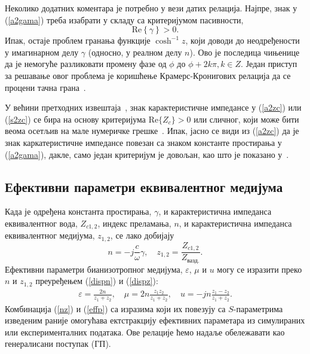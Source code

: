 \documentclass[main.tex]{subfiles}
\begin{document}
Неколико додатних коментара је потребно у вези датих релација. Најпре, знак у (\ref{a2gama}) треба изабрати у складу са критеријумом пасивности, 
\begin{equation}\label{pasivnost}
\mathrm{Re}\left\lbrace\gamma\right\rbrace > 0.
\end{equation}
Ипак, остаје проблем гранања функције $\cosh^{-1}{z}$, који доводи до неодређености у имагинарном делу $\gamma$ (односно, у реалном делу $n$). Ово је последица чињенице да је немогуће разликовати промену фазе од $\phi$ до $\phi + 2k\pi, k\in Z$. Један приступ за решавање овог проблема је коришћење Крамерс-Кронигових релација да се процени тачна грана~\cite{Szabo:10}.

У већини претходних извештаја~\cite{Nicol:70, Weir:74, Smith:02, Markos:03, Mao:05}, знак карактеристичне импедансе у (\ref{a2zc}) или (\ref{s2zc}) се бира на основу критеријума $\mathrm{Re}\{Z_c\}>0$ или сличног, који може бити веома осетљив на мале нумеричке грешке~\cite{Chen:04}. Ипак, јасно се види из (\ref{a2zc}) да је знак каркатеристичне импедансе повезан са знаком константе простирања у (\ref{a2gama}), дакле, само један критеријум је довољан, као што је показано у~\cite{Chen:04}.

\subsection{Ефективни параметри еквивалентног медијума}
Када је одређена константа простирања, $\gamma$, и карактеристична импеданса еквивалентног вода, $Z_{c1,2}$, индекс преламања, $n$, и карактеристична импеданса еквивалентног медијума, $z_{1,2}$, се лако добијају
\begin{equation}\label{nz}
n = -j\frac{c}{\omega}\gamma,\quad z_{1,2}=\frac{Z_{c1,2}}{Z_{вазд.}}.
\end{equation}
Ефективни параметри бианизотропног медијума, $\varepsilon$, $\mu$ и $u$ могу се изразити преко $n$ и $z_{1,2}$ преуређењем (\ref{dispn}) и (\ref{dispz}):
\begin{equation}\label{effp}
\begin{split}
	\varepsilon = \frac{2n}{z_1+z_2},\quad
	\mu = 2n\frac{z_1z_2}{z_1+z_2},\quad
	u = -jn\frac{z_1-z_2}{z_1+z_2}.
\end{split}
\end{equation}
Комбинација (\ref{nz}) и (\ref{effp}) са изразима који их повезују са $S$-параметрима изведеним раније омогућава ектстракцију ефективних параметара из симулираних или експерименталних података. Ове релације ћемо надаље обележавати као генералисани поступак ($ГП$).
\end{document}
